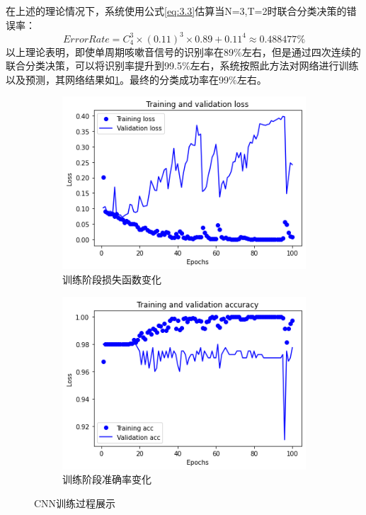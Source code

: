 在上述的理论情况下，系统使用公式\ref{eq:3.3}估算当N=3,T=2时联合分类决策的错误率：
\begin{equation}
    \label{eq:3.3}
    ErrorRate = C_4^3\times(0.11)^3\times0.89+0.11^4 \approx 0.488477\%
\end{equation}
以上理论表明，即使单周期咳嗽音信号的识别率在89\%左右，但是通过四次连续的联合分类决策，可以将识别率提升到99.5\%左右，系统按照此方法对网络进行训练以及预测，其网络结果如\ref{fig:xunlian-image}。最终的分类成功率在99\%左右。
    \begin{figure}[h]
      \centering
      \begin{subfigure}{0.4\textwidth}
        \includegraphics[width=\linewidth]{figures/100.png}
        \caption{训练阶段损失函数变化}
      \end{subfigure}
      \begin{subfigure}{0.4\textwidth}
        \includegraphics[width=\linewidth]{figures/100轮 准确性.png}
        \caption{训练阶段准确率变化}
      \end{subfigure}
      \caption{CNN训练过程展示}
      \label{fig:xunlian-image}
    \end{figure}
